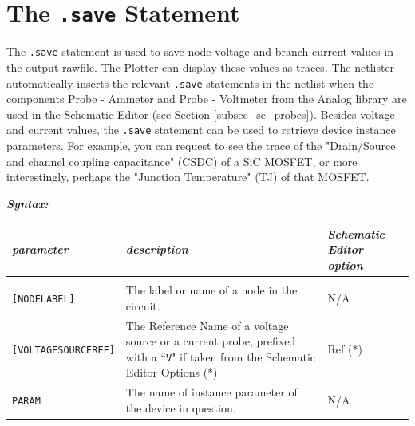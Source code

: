 \section{The \texttt{.save} Statement}
\label{subsec_satco_savestatement}

The \texttt{.save} statement is used to save node voltage and branch current values in the output rawfile. The Plotter can display these values as traces. The netlister automatically inserts the relevant \texttt{.save} statements in the netlist when the components \textsf{Probe - Ammeter} and \textsf{Probe - Voltmeter} from the \textsf{Analog} library are used in the Schematic Editor (see Section \ref{subsec_se_probes}). Besides voltage and current values, the \texttt{.save} statement can be used to retrieve device instance parameters. For example, you can request to see the trace of the "Drain/Source and channel coupling capacitance" (CSDC) of a SiC MOSFET, or more interestingly, perhaps the "Junction Temperature" (TJ) of that MOSFET.


\textbf{\textit{Syntax:}}


\begin{tabular}{lp{5.5cm}p{5cm}}
\textit{parameter} & \textit{description} & \textit{Schematic Editor option}\\ \hline \\ \vspace{-0.8\parskip}
\texttt{[NODELABEL]} & The label or name of a node in the circuit. & \textsf{N/A} \\
\texttt{[VOLTAGESOURCEREF]} & {The Reference Name of a voltage source or a current probe, prefixed with a ``\texttt{V}" if taken from the Schematic Editor Options (*)} & \textsf{Ref} (*) \\ 
\texttt{PARAM} & The name of instance parameter of the device in question. & \textsf{N/A} \\
\end{tabular}

